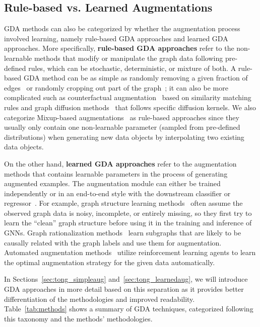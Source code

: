 \documentclass[11pt]{article}
\begin{document}
\subsection{Rule-based vs. Learned Augmentations}

GDA methods can also be categorized by whether the augmentation process involved learning, namely rule-based GDA approaches and learned GDA approaches. More specifically, \textbf{rule-based GDA approaches} refer to the non-learnable methods that modify or manipulate the graph data following pre-defined rules, which can be stochastic, deterministic, or mixture of both. A rule-based GDA method can be as simple as randomly removing a given fraction of edges~\cite{rong2019dropedge} or randomly cropping out part of the graph~\cite{you2020graph}; it can also be more complicated such as counterfactual augmentation~\cite{zhao2021counterfactual} based on similarity matching rules and graph diffusion methods~\cite{klicpera2019diffusion} that follows specific diffusion kernels. We also categorize Mixup-based augmentations~\cite{han2022G} as rule-based approaches since they usually only contain one non-learnable parameter (sampled from pre-defined distributions) when generating new data objects by interpolating two existing data objects. 

On the other hand, \textbf{learned GDA approaches} refer to the augmentation methods that contains learnable parameters in the process of generating augmented examples. The augmentation module can either be trained independently or in an end-to-end style with the downstream classifier or regressor~\cite{zhao2021data}. For example, graph structure learning methods~\cite{zhu2021survey,jin2020graph,zhao2021data} often assume the observed graph data is noisy, incomplete, or entirely missing, so they first try to learn the ``clean'' graph structure before using it in the training and inference of GNNs. Graph rationalization methods~\cite{wu2021discovering,liu2022graph} learn subgraphs that are likely to be causally related with the graph labels and use them for augmentation. Automated augmentation methods~\cite{zhao2022autogda,luo2022automated} utilize reinforcement learning agents to learn the optimal augmentation strategy for the given data automatically. 

In Sections~\ref{sec:tong_simpleaug} and~\ref{sec:tong_learnedaug}, we will introduce GDA approaches in more detail based on this separation as it provides better differentiation of the methodologies and improved readability. Table~\ref{tab:methods} shows a summary of GDA techniques, categorized following this taxonomy and the methods' methodologies.
\end{document}
